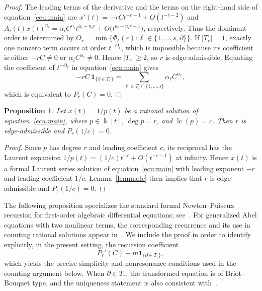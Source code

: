 \documentclass[12pt,a4paper]{amsart}
\numberwithin{theorem}{section}
\newtheorem{proposition}[theorem]{Proposition}
\theoremstyle{definition}
\begin{document}
	\begin{proof}
		The leading terms of the derivative and the terms on the right-hand side of equation~\eqref{ecu:main} are $x'(t)=-rCt^{-r-1}+O(t^{-r-2})$ and $A_i(t)x(t)^{n_i}=\alpha_iC^{n_i}t^{a_i-n_ir}+O\bigl(t^{a_i-n_ir-1}\bigr)$, respectively. Thus the dominant order is determined by $O_r=\min\{\Phi_\ell(r):\ell\in\{1,\ldots,s,\partial\}\}$. If $|T_r|=1$, exactly one nonzero term occurs at order $t^{-O_r}$, which is impossible because its coefficient is either $-rC\neq0$ or $\alpha_iC^{n_i}\neq0$. Hence $|T_r|\geq2$, so $r$ is edge-admissible. Equating the coefficient of $t^{-O_r}$ in equation~\eqref{ecu:main} gives
		\[
		-rC\,\mathbf{1}_{\{\partial\in T_r\}}=\sum_{\ell\in T_r\cap\{1,\ldots,s\}}\alpha_\ell C^{n_\ell},
		\]
		which is equivalent to $P_r(C)=0$.
	\end{proof}
	
	\begin{proposition}\label{prop:leading_coeff_root}
		Let $x(t)=1/p(t)$ be a rational solution of equation~\eqref{ecu:main}, where $p\in\Bbbk[t]$, $\deg p=r$, and $\operatorname{lc}(p)=c$. Then $r$ is edge-admissible and $P_r(1/c)=0$.
	\end{proposition}
	
	\begin{proof}
		Since $p$ has degree $r$ and leading coefficient $c$, its reciprocal has the Laurent expansion $1/p(t)=(1/c)t^{-r}+O(t^{-r-1})$ at infinity. Hence $x(t)$ is a formal Laurent series solution of equation~\eqref{ecu:main} with leading exponent $-r$ and leading coefficient $1/c$. Lemma~\ref{lemma:lc} then implies that $r$ is edge-admissible and $P_r(1/c)=0$.
	\end{proof}
	
	The following proposition specializes the standard formal Newton--Puiseux recursion for first-order algebraic differential equations; see~\cite{Cano2005NewtonPolygon,DeminaPuiseux2022}. For generalized Abel equations with two nonlinear terms, the corresponding recurrence and its use in counting rational solutions appear in~\cite[Appendix~A and Section~3]{DuZhao2026}.
	We include the proof in order to identify explicitly, in the present setting, the recursion coefficient
	\[
	P_r'(C)+m\mathbf{1}_{\{\partial\in T_r\}},
	\]
	which yields the precise simplicity and nonresonance conditions used in the counting argument below. When $\partial\in T_r$, the transformed equation is of Briot--Bouquet type, and the uniqueness statement is also consistent with~\cite[Proposition~2.1]{Rong2013}.
	
\end{document}
